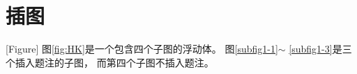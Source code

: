 \section{插图}[Figure]
图\ref{fig:HK}是一个包含四个子图的浮动体。
图\ref{subfig1-1}$\sim$ \ref{subfig1-3}是三个插入题注的子图，
而第四个子图不插入题注。
